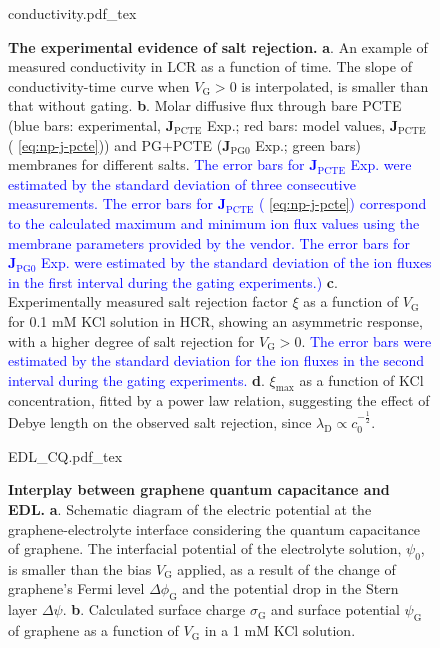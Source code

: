 \begin{figure}[H]
  \centering
   {conductivity.pdf_tex}
  \caption{ \textbf{The experimental evidence of salt rejection.}
    \textbf{a}. An example of measured conductivity in LCR as a
    function of time. The slope of conductivity-time curve when
    $V_{\mathrm{G}}>0$ is interpolated, is smaller than that without
    gating. \textbf{b}. Molar diffusive flux through bare PCTE (blue
    bars: experimental, $\symbf{J}_{\mathrm{PCTE}}$ Exp.; red
    bars: model values, $\symbf{J}_{\mathrm{PCTE}}$
    ( \autoref{eq:np-j-pcte})) and PG+PCTE
    ($\symbf{J}_{\mathrm{PG0}}$ Exp.; green bars) membranes for
    different salts. \textcolor{blue}{The error bars for
      $\symbf{J}_{\mathrm{PCTE}}$ Exp. were estimated by the
      standard deviation of three consecutive measurements. The error bars
      for $\symbf{J}_{\mathrm{PCTE}}$ ( \autoref{eq:np-j-pcte})
      correspond to the calculated maximum and minimum ion flux values
      using the membrane parameters provided by the vendor. The error
      bars for $\symbf{J}_{\mathrm{PG0}}$ Exp. were estimated by
      the standard deviation of the ion fluxes in the first interval
      during the gating experiments.)}  \textbf{c}. Experimentally
    measured salt rejection factor $\xi$ as a function of
    $V_{\mathrm{G}}$ for 0.1 mM KCl solution in HCR, showing an
    asymmetric response, with a higher degree of salt rejection for
    $V_{\mathrm{G}}>0$. \textcolor{blue}{The error bars were estimated
      by the standard deviation for the ion fluxes in the second
      interval during the gating experiments.}
    \textbf{d}. $\xi_{\mathrm{max}}$ as a function of KCl
    concentration, fitted by a power law relation, suggesting the
    effect of Debye length on the observed salt rejection, since
    $\lambda_{\mathrm{D}} \propto c_{0}^{-\frac{1}{2}}$.}
  \label{fig:np-2} 
\end{figure}

\begin{figure}[H]
  \centering
  {EDL_CQ.pdf_tex}
  \caption{\textbf{Interplay between graphene quantum capacitance and
      EDL.} \textbf{a}. Schematic diagram of the electric
    potential at the graphene-electrolyte interface considering the
    quantum capacitance of graphene. The interfacial potential of the
    electrolyte solution, $\psi_{0}$, is smaller than the bias
    $V_{\mathrm{G}}$ applied, as a result of the change of graphene's
    Fermi level $\Delta \phi_{\mathrm{G}}$ and the potential drop in
    the Stern layer $\Delta \psi$. \textbf{b}. Calculated surface
    charge $\sigma_{\mathrm{G}}$ and surface potential
    $\psi_{\mathrm{G}}$ of graphene as a function of $V_{\mathrm{G}}$
    in a 1 mM KCl solution. }
  \label{fig:np-3}
\end{figure}

